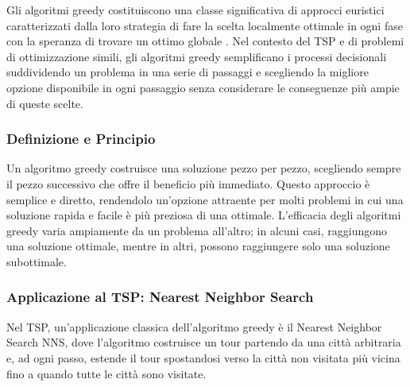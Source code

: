 Gli algoritmi greedy costituiscono una classe significativa di approcci euristici caratterizzati dalla loro strategia di fare la scelta localmente ottimale in ogni fase con la speranza di trovare un ottimo globale \cite{Cormen2009}. Nel contesto del \gls{TSP} e di problemi di ottimizzazione simili, gli algoritmi greedy semplificano i processi decisionali suddividendo un problema in una serie di passaggi e scegliendo la migliore opzione disponibile in ogni passaggio senza considerare le conseguenze più ampie di queste scelte\cite{Johnson2002}.

\subsubsection{Definizione e Principio}

Un algoritmo greedy costruisce una soluzione pezzo per pezzo, scegliendo sempre il pezzo successivo che offre il beneficio più immediato\cite{Papadimitriou1998}. Questo approccio è semplice e diretto, rendendolo un'opzione attraente per molti problemi in cui una soluzione rapida e facile è più preziosa di una ottimale. L'efficacia degli algoritmi greedy varia ampiamente da un problema all'altro; in alcuni casi, raggiungono una soluzione ottimale, mentre in altri, possono raggiungere solo una soluzione subottimale\cite{Lawler1985}.

\subsubsection{Applicazione al \gls{TSP}: Nearest Neighbor Search}

Nel \gls{TSP}, un'applicazione classica dell'algoritmo greedy è il Nearest Neighbor Search \gls{NNS}, dove l'algoritmo costruisce un tour partendo da una città arbitraria e, ad ogni passo, estende il tour spostandosi verso la città non visitata più vicina fino a quando tutte le città sono visitate\cite{Gutin2016}.


